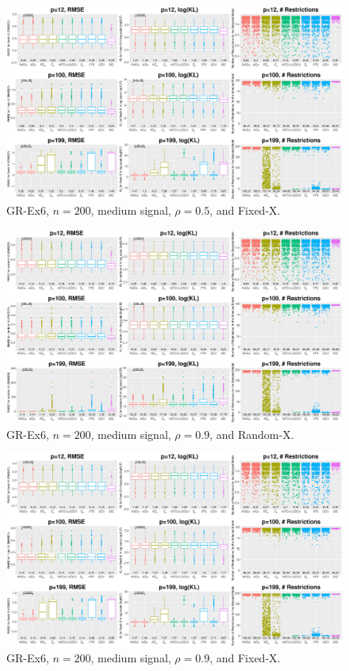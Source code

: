 \begin{figure}[!ht]
\centering
\includegraphics[width=\textwidth]{figures/supplement/fixedx_GR-Ex6_n200_msnr_rho05.eps}
\caption{GR-Ex6, $n=200$, medium signal, $\rho=0.5$, and Fixed-X.}
\end{figure}
\clearpage
\begin{figure}[!ht]
\centering
\includegraphics[width=\textwidth]{figures/supplement/randomx_GR-Ex6_n200_msnr_rho09.eps}
\caption{GR-Ex6, $n=200$, medium signal, $\rho=0.9$, and Random-X.}
\end{figure}
\begin{figure}[!ht]
\centering
\includegraphics[width=\textwidth]{figures/supplement/fixedx_GR-Ex6_n200_msnr_rho09.eps}
\caption{GR-Ex6, $n=200$, medium signal, $\rho=0.9$, and Fixed-X.}
\end{figure}
